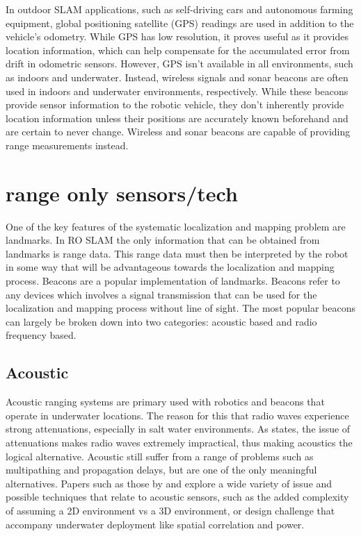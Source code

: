\documentclass[conference]{IEEEtran}
\begin{document}
	In outdoor SLAM applications, such as self-driving cars and autonomous farming equipment, global positioning satellite (GPS) readings are used in addition to the vehicle's odometry. While GPS has low resolution, it proves useful as it provides location information, which can help compensate for the accumulated error from drift in odometric sensors. However, GPS isn't available in all environments, such as indoors and underwater. Instead, wireless signals and sonar beacons are often used in indoors and underwater environments, respectively. While these beacons provide sensor information to the robotic vehicle, they don't inherently provide location information unless their positions are accurately known beforehand and are certain to never change. Wireless and sonar beacons are capable of providing range measurements instead.
	
	\section{range only sensors/tech}
	
	One of the key features of the systematic localization and mapping problem are landmarks. In RO SLAM the only information that can be obtained from landmarks is range data. This range data must then be interpreted by the robot in some way that will be advantageous towards the localization and mapping process. Beacons are a popular implementation of landmarks. Beacons refer to any devices which involves a signal transmission that can be used for the localization and mapping process without line of sight. The most popular beacons can largely be broken down into two categories: acoustic based and radio frequency based.
	
	\subsection{Acoustic}
	
	Acoustic ranging systems are primary used with robotics and beacons that operate in underwater locations. The reason for this that radio waves experience strong attenuations, especially in salt water environments. As \cite{Partan2007} states, the issue of attenuations makes radio waves extremely impractical, thus making acoustics the logical alternative. Acoustic still suffer from a range of problems such as multipathing and propagation delays, but are one of the only meaningful alternatives. Papers such as those by \cite{Erol-Kantarci2011} and \cite{Akyildiz2005} explore a wide variety of issue and possible techniques that relate to acoustic sensors, such as the added complexity of assuming a 2D environment vs a 3D environment, or design challenge that accompany underwater deployment like spatial correlation and power. 
  	
\end{document}

